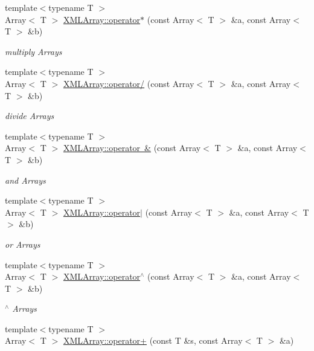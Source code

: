 \begin{DoxyCompactItemize}
{\footnotesize template$<$typename T $>$ }\\Array$<$ T $>$ \mbox{\hyperlink{namespaceXMLArray_ac9f5d1fb8f1862f3d57ddf2745f55b62}{X\+M\+L\+Array\+::operator$\ast$}} (const Array$<$ T $>$ \&a, const Array$<$ T $>$ \&b)
\begin{DoxyCompactList}\small\item\em multiply Arrays \end{DoxyCompactList}\item 
{\footnotesize template$<$typename T $>$ }\\Array$<$ T $>$ \mbox{\hyperlink{namespaceXMLArray_a3f57a2620a7685e7c85e5a363ee053d1}{X\+M\+L\+Array\+::operator/}} (const Array$<$ T $>$ \&a, const Array$<$ T $>$ \&b)
\begin{DoxyCompactList}\small\item\em divide Arrays \end{DoxyCompactList}\item 
{\footnotesize template$<$typename T $>$ }\\Array$<$ T $>$ \mbox{\hyperlink{namespaceXMLArray_a4e97a656e19bfbb4c5574c3a60b2ed93}{X\+M\+L\+Array\+::operator \&}} (const Array$<$ T $>$ \&a, const Array$<$ T $>$ \&b)
\begin{DoxyCompactList}\small\item\em and Arrays \end{DoxyCompactList}\item 
{\footnotesize template$<$typename T $>$ }\\Array$<$ T $>$ \mbox{\hyperlink{namespaceXMLArray_acde7f1ff51638a7a8f4cf4a096e08e1c}{X\+M\+L\+Array\+::operator$\vert$}} (const Array$<$ T $>$ \&a, const Array$<$ T $>$ \&b)
\begin{DoxyCompactList}\small\item\em or Arrays \end{DoxyCompactList}\item 
{\footnotesize template$<$typename T $>$ }\\Array$<$ T $>$ \mbox{\hyperlink{namespaceXMLArray_a2aca927799841b80136c3d48bc8d3e29}{X\+M\+L\+Array\+::operator$^\wedge$}} (const Array$<$ T $>$ \&a, const Array$<$ T $>$ \&b)
\begin{DoxyCompactList}\small\item\em $^\wedge$ Arrays \end{DoxyCompactList}\item 
{\footnotesize template$<$typename T $>$ }\\Array$<$ T $>$ \mbox{\hyperlink{namespaceXMLArray_a39a31427301b9eee1d81eafe77f67c47}{X\+M\+L\+Array\+::operator+}} (const T \&s, const Array$<$ T $>$ \&a)

\end{DoxyCompactItemize}

